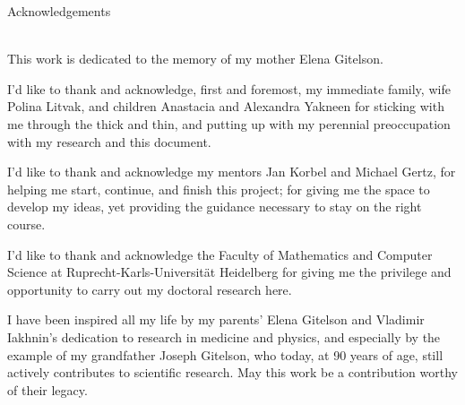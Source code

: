 \begin{Huge}
Acknowledgements
\end{Huge}\\[1cm]
\noindent
This work is dedicated to the memory of my mother Elena Gitelson. 

I'd like to thank and acknowledge, first and foremost, my immediate family, wife Polina Litvak, and children Anastacia and Alexandra Yakneen for sticking with me through the thick and thin, and putting up with my perennial preoccupation with my research and this document.

I'd like to thank and acknowledge my mentors Jan Korbel and Michael Gertz, for helping me start, continue, and finish this project; for giving me the space to develop my ideas, yet providing the guidance necessary to stay on the right course. 

I'd like to thank and acknowledge the Faculty of Mathematics and Computer Science at Ruprecht-Karls-Universität Heidelberg for giving me the privilege and opportunity to carry out my doctoral research here.

I have been inspired all my life by my parents' Elena Gitelson and Vladimir Iakhnin's dedication to research in medicine and physics, and especially by the example of my grandfather Joseph Gitelson, who today, at 90 years of age, still actively contributes to scientific research. May this work be a contribution worthy of their legacy.
\newpage
\null
\thispagestyle{empty}